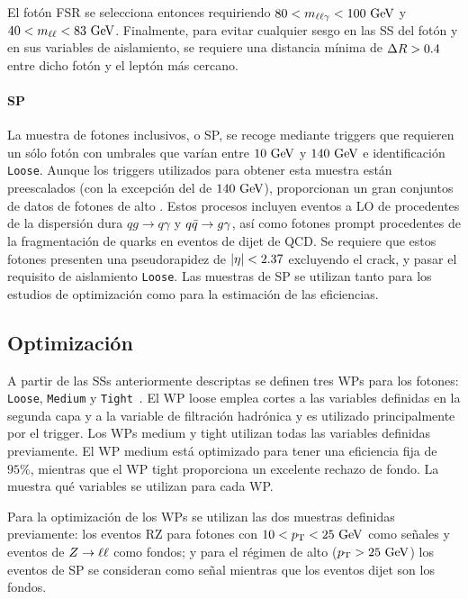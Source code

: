 El fotón \ac{FSR} se selecciona entonces requiriendo \(80<m_{\ell\ell\gamma}<100~\text{GeV}\) y \(40<m_{\ell\ell}<83~\text{GeV}\). Finalmente, para evitar cualquier sesgo en las \ac{SS} del fotón y en sus variables de aislamiento, se requiere una distancia mínima de \(\Delta R>0.4\) entre dicho fotón y el leptón más cercano.


\paragraph{\acf{SP}}

La muestra de fotones inclusivos, o \acf{SP}, se recoge mediante triggers que requieren un sólo fotón con umbrales que varían entre \(10~\text{GeV}\) y \(140~\text{GeV}\) e identificación \texttt{Loose}. Aunque los triggers utilizados para obtener esta muestra están preescalados (con la excepción del de \(140~\text{GeV}\)), proporcionan un gran conjuntos de datos de fotones de alto \pt.
Estos procesos incluyen eventos a \ac{LO} de \gammajet procedentes de la dispersión dura \(qg\to q\gamma\) y \(q\bar{q} \rightarrow g\gamma\), así como fotones prompt procedentes de la fragmentación de quarks en eventos de dijet de \acs{QCD}.
Se requiere que estos fotones presenten una pseudorapidez de \(|\eta|<2.37\) excluyendo el crack, y pasar el requisito de aislamiento \texttt{Loose}. Las muestras de \ac{SP} se utilizan tanto para los estudios de optimización como para la estimación de las eficiencias.


\subsection{Optimización}
\label{subsec:pid_ss:pid:optimisation}

A partir de las \acp{SS} anteriormente descriptas se definen tres \acp{WP} para los fotones: \texttt{Loose}, \texttt{Medium} y \texttt{Tight}~\cite{ATLAS-EGamma-Performance-2024}. El \ac{WP} loose emplea cortes a las variables definidas en la segunda capa y a la variable de filtración hadrónica y es utilizado principalmente por el trigger.
Los \acp{WP} medium y tight utilizan todas las variables definidas previamente. El \ac{WP} medium está optimizado para tener una eficiencia fija de \(95\%\), mientras que el \ac{WP} tight proporciona un excelente rechazo de fondo. La \Tab{\ref{tab:pid_ss:ss:ss_variables}} muestra qué variables se utilizan para cada \ac{WP}.

Para la optimización de los \acp{WP} se utilizan las dos muestras definidas previamente: los eventos \ac{RZ} para fotones con \(10<p_{\text{T}}<25~\text{GeV}\) como señales y eventos de \(Z\rightarrow \ell\ell\) como fondos; y para el régimen de alto \pt (\(p_{\text{T}}>25~\text{GeV}\)) los eventos de \ac{SP} se consideran como señal mientras que los eventos dijet son los fondos.

